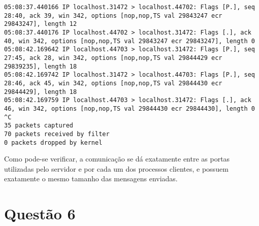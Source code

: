 \documentclass[a4paper,10pt]{article}
\begin{document}
\begin{lstlisting}
05:08:37.440166 IP localhost.31472 > localhost.44702: Flags [P.], seq 28:40, ack 39, win 342, options [nop,nop,TS val 29843247 ecr 29843247], length 12
05:08:37.440176 IP localhost.44702 > localhost.31472: Flags [.], ack 40, win 342, options [nop,nop,TS val 29843247 ecr 29843247], length 0
05:08:42.169642 IP localhost.44703 > localhost.31472: Flags [P.], seq 27:45, ack 28, win 342, options [nop,nop,TS val 29844429 ecr 29839235], length 18
05:08:42.169742 IP localhost.31472 > localhost.44703: Flags [P.], seq 28:46, ack 45, win 342, options [nop,nop,TS val 29844430 ecr 29844429], length 18
05:08:42.169759 IP localhost.44703 > localhost.31472: Flags [.], ack 46, win 342, options [nop,nop,TS val 29844430 ecr 29844430], length 0
^C
35 packets captured
70 packets received by filter
0 packets dropped by kernel

\end{lstlisting}

Como pode-se verificar, a comunicação se dá exatamente entre as portas utilizadas pelo servidor e por cada um dos processos clientes, e possuem exatamente o mesmo tamanho das mensagens enviadas.



\section{Questão 6}
\end{document}
